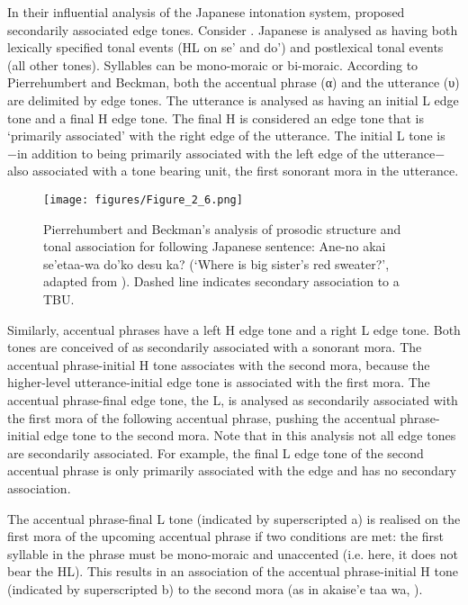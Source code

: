 In their influential analysis of the Japanese intonation system, \citet{PierrBeck1988} proposed secondarily associated edge tones. Consider . Japanese is analysed as having both lexically specified tonal events (HL on se’ and do’) and postlexical tonal events (all other tones). Syllables can be mono-moraic or bi-moraic. According to Pierrehumbert and Beckman, both the accentual phrase (α) and the utterance (υ) are delimited by edge tones. The utterance is analysed as having an initial L edge tone and a final H edge tone. The final H is considered an edge tone that is ‘primarily associated’ with the right edge of the utterance. The initial L tone is −in addition to being primarily associated with the left edge of the utterance− also associated with a tone bearing unit, the first sonorant mora in the utterance.  

\begin{figure}
  \centering 
   \texttt{[image: figures/Figure\_2\_6.png]}
  \caption{Pierrehumbert and Beckman’s analysis of prosodic structure and tonal association for following Japanese sentence: Ane-no akai se’etaa-wa do’ko desu ka? (‘Where is big sister’s red sweater?’, adapted from \citet[21]{PierrBeck1988}). Dashed line indicates secondary association to a TBU.}
   \label{fig:2.6}
   \end{figure}
   
Similarly, accentual phrases have a left H edge tone and a right L edge tone. Both tones are conceived of as secondarily associated with a sonorant mora. The accentual phrase-initial H tone associates with the second mora, because the higher-level utterance-initial edge tone is associated with the first mora. The accentual phrase-final edge tone, the L, is analysed as secondarily associated with the first mora of the following accentual phrase, pushing the accentual phrase-initial edge tone to the second mora. Note that in this analysis not all edge tones are secondarily associated. For example, the final L edge tone of the second accentual phrase is only primarily associated with the edge and has no secondary association.
 
\newpage  
The accentual phrase-final L tone (indicated by superscripted a) is realised on the first mora of the upcoming accentual phrase if two conditions are met: the first syllable in the phrase must be mono-moraic and unaccented (i.e. here, it does not bear the HL). This results in an association of the accentual phrase-initial H tone (indicated by superscripted b) to the second mora (as in akaise’e taa wa, ).

